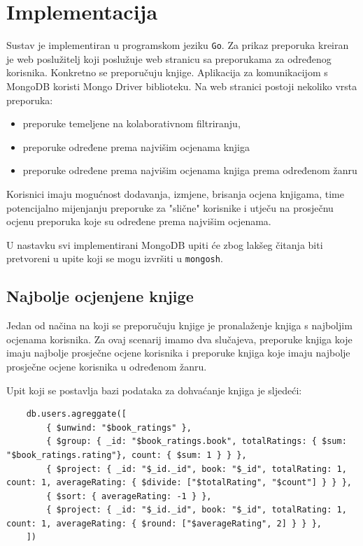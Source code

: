 \documentclass[]{foi}
\begin{document}
\section{Implementacija}

Sustav je implementiran u programskom jeziku \texttt{Go}. Za prikaz preporuka kreiran je web poslužitelj koji poslužuje web stranicu sa preporukama za
određenog korisnika. Konkretno se preporučuju knjige. Aplikacija za komunikacijom s MongoDB koristi Mongo Driver biblioteku.
Na web stranici postoji nekoliko vrsta preporuka:
\begin{itemize}
	\item preporuke temeljene na kolaborativnom filtriranju,
	\item preporuke određene prema najvišim ocjenama knjiga
	\item preporuke određene prema najvišim ocjenama knjiga prema određenom žanru
\end{itemize}
Korisnici imaju mogućnost dodavanja, izmjene, brisanja ocjena knjigama, time potencijalno mijenjanju preporuke za "slične" korisnike
i utječu na prosječnu ocjenu preporuka koje su određene prema najvišim ocjenama.

U nastavku svi implementirani MongoDB upiti će zbog lakšeg čitanja biti pretvoreni u upite koji se mogu izvršiti u \texttt{mongosh}.

\subsection{Najbolje ocjenjene knjige}

Jedan od načina na koji se preporučuju knjige je pronalaženje knjiga s najboljim ocjenama korisnika.
Za ovaj scenarij imamo dva slučajeva, preporuke knjiga koje imaju najbolje prosječne ocjene korisnika
i preporuke knjiga koje imaju najbolje prosječne ocjene korisnika u određenom žanru.

Upit koji se postavlja bazi podataka za dohvaćanje knjiga je sljedeći:
\begin{verbatim}
    db.users.agreggate([
        { $unwind: "$book_ratings" },
        { $group: { _id: "$book_ratings.book", totalRatings: { $sum: "$book_ratings.rating"}, count: { $sum: 1 } } },
        { $project: { _id: "$_id._id", book: "$_id", totalRating: 1, count: 1, averageRating: { $divide: ["$totalRating", "$count"] } } },
        { $sort: { averageRating: -1 } },
        { $project: { _id: "$_id._id", book: "$_id", totalRating: 1, count: 1, averageRating: { $round: ["$averageRating", 2] } } },
    ])
\end{verbatim}
\label{lst:najbolje_ocjene_knjiga}
\end{document}
